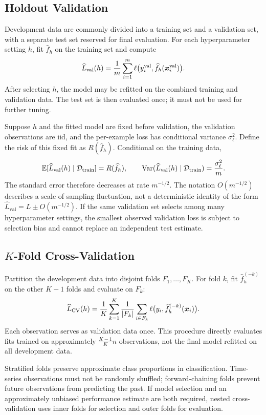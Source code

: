 \subsection{Holdout Validation}

Development data are commonly divided into a training set and a validation set, with a separate test set reserved for final evaluation. For each hyperparameter setting $h$, fit $\widehat f_h$ on the training set and compute
\[
  \widehat L_{\mathrm{val}}(h)
  =\frac1m\sum_{i=1}^{m}
    \ell\bigl(
      y_i^{\mathrm{val}},
      \widehat f_h(\bm{x}_i^{\mathrm{val}})
    \bigr).
\]
After selecting $h$, the model may be refitted on the combined training and validation data. The test set is then evaluated once; it must not be used for further tuning.

Suppose $h$ and the fitted model are fixed before validation, the validation observations are iid, and the per-example loss has conditional variance $\sigma_\ell^2$. Define the risk of this fixed fit as $R(\widehat f_h)$. Conditional on the training data,
\[
  \mathbb{E}[\widehat L_{\mathrm{val}}(h)\mid\mathcal D_{\mathrm{train}}]
  =R(\widehat f_h),
  \qquad
  \operatorname{Var}(\widehat L_{\mathrm{val}}(h)\mid\mathcal D_{\mathrm{train}})
  =\frac{\sigma_\ell^2}{m}.
\]
The standard error therefore decreases at rate $m^{-1/2}$. The notation $O(m^{-1/2})$ describes a scale of sampling fluctuation, not a deterministic identity of the form
$\widehat L_{\mathrm{val}}=L\pm O(m^{-1/2})$. If the same validation set selects among many hyperparameter settings, the smallest observed validation loss is subject to selection bias and cannot replace an independent test estimate.

\subsection{\texorpdfstring{$K$-Fold Cross-Validation}{K-Fold Cross-Validation}}

Partition the development data into disjoint folds $F_1,\ldots,F_K$. For fold $k$, fit $\widehat f_h^{(-k)}$ on the other $K-1$ folds and evaluate on $F_k$:
\[
  \widehat L_{\mathrm{CV}}(h)
  =\frac1K\sum_{k=1}^{K}
    \frac{1}{\left\lvert F_k\right\rvert}
    \sum_{i\in F_k}
      \ell\bigl(y_i,\widehat f_h^{(-k)}(\bm{x}_i)\bigr).
\]
Each observation serves as validation data once. This procedure directly evaluates fits trained on approximately $\frac{K-1}{K}n$ observations, not the final model refitted on all development data.

Stratified folds preserve approximate class proportions in classification. Time-series observations must not be randomly shuffled; forward-chaining folds prevent future observations from predicting the past. If model selection and an approximately unbiased performance estimate are both required, nested cross-validation uses inner folds for selection and outer folds for evaluation.


